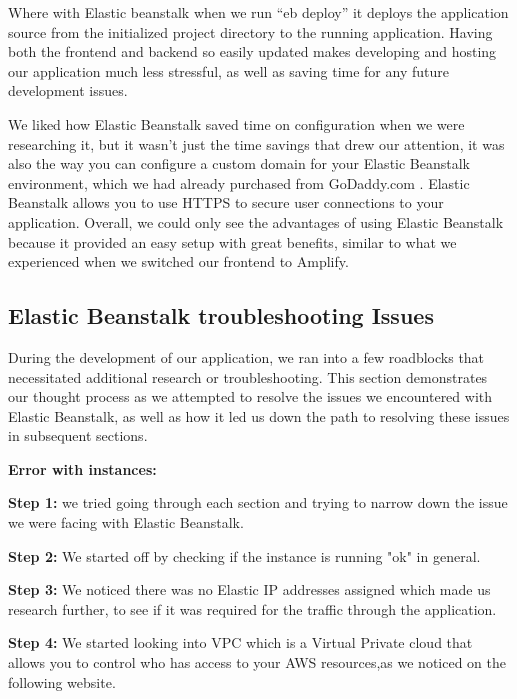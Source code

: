 Where with Elastic beanstalk when we run “eb deploy” it deploys the application source from the initialized project directory to the running application. Having both the frontend and backend so easily updated makes developing and hosting our application much less stressful, as well as saving time for any future development issues.
\hfill \break

We liked how Elastic Beanstalk saved time on configuration when we were researching it, but it wasn't just the time savings that drew our attention, it was also the way you can configure a custom domain for your Elastic Beanstalk environment, which we had already purchased from GoDaddy.com \cite{ref21}. Elastic Beanstalk allows you to use HTTPS to secure user connections to your application.
\hfill \break
\hfill \break
Overall, we could only see the advantages of using Elastic Beanstalk because it provided an easy setup with great benefits, similar to what we experienced when we switched our frontend to Amplify.



\subsection{Elastic Beanstalk troubleshooting Issues}


During the development of our application, we ran into a few roadblocks that necessitated additional research or troubleshooting. This section demonstrates our thought process as we attempted to resolve the issues we encountered with Elastic Beanstalk, as well as how it led us down the path to resolving these issues in subsequent sections.

\hfill \break
\large
\textbf{Error with instances:}

\hfill \break

\textbf{Step 1:}\hfill \break
we tried going through each section and trying to narrow down the issue we were facing with Elastic Beanstalk.\hfill \break

\textbf{Step 2:}\hfill \break
We started off by checking if the instance is running "ok" in general.\hfill \break

\textbf{Step 3:}\hfill \break
We noticed there was no Elastic IP addresses assigned which made us research further, to see if it was required for the traffic through the application.\hfill \break

\textbf{Step 4:}\hfill \break
We started looking into VPC which is a Virtual Private cloud that allows you to control who has access to your AWS resources,as we noticed on the following website.\hfill \break

